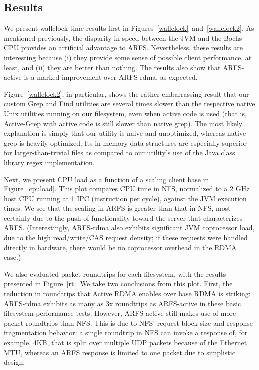 \documentclass[10pt]{article}
\begin{document}
\subsection{Results}

We present wallclock time results first in
Figures~\ref{wallclock}~and~\ref{wallclock2}. As mentioned previously,
the disparity in speed between the JVM and the Bochs CPU provides an
artificial advantage to ARFS. Nevertheless, these results are
interesting because (i) they provide some sense of possible client
performance, at least, and (ii) they are better than nothing. The
results also show that ARFS-active is a marked improvement over
ARFS-rdma, as expected.

Figure~\ref{wallclock2}, in particular, shows the rather embarrassing
result that our custom Grep and Find utilities are several times
slower than the respective native Unix utilities running on our
filesystem, even when active code is used (that is, Active-Grep with
active code is still slower than native grep). The most likely
explanation is simply that our utility is naive and unoptimized,
whereas native grep is heavily optimized. Its in-memory data
structures are especially superior for larger-than-trivial files as
compared to our utility's use of the Java class library regex
implementation.

Next, we present CPU load as a function of a scaling client base in
Figure~\ref{cpuload}. This plot compares CPU time in NFS, normalized
to a 2 GHz host CPU running at 1 IPC (instruction per cycle), against
the JVM execution times. We see that the scaling in ARFS is greater
than that in NFS, most certainly due to the push of functionality
toward the server that characterizes ARFS. (Interestingly, ARFS-rdma
also exhibits significant JVM coprocessor load, due to the high
read/write/CAS request density; if these requests were handled
directly in hardware, there would be no coprocessor overhead in the
RDMA case.)

We also evaluated packet roundtrips for each filesystem, with the
results presented in Figure~\ref{rt}. We take two conclusions from
this plot. First, the reduction in roundtrips that Active RDMA enables
over base RDMA is striking: ARFS-rdma exhibits as many as 3x
roundtrips as ARFS-active in these basic filesystem performance
tests. However, ARFS-active still makes use of more packet roundtrips
than NFS. This is due to NFS' request block size and
response-fragmentation behavior: a single roundtrip in NFS can invoke
a response of, for example, 4KB, that is split over multiple UDP
packets because of the Ethernet MTU, whereas an ARFS response is
limited to one packet due to simplistic design.
\end{document}
